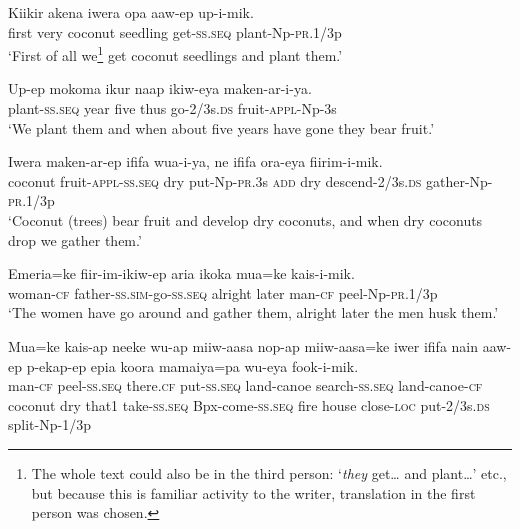 \ea
\gll  Kiikir  akena  iwera  opa  aaw-ep  up-i-mik. \\
first  very  coconut  seedling  get-\textsc{ss.seq}  plant-Np-\textsc{pr}.1/3p \\
\glt ‘First of all we\footnote{The whole text could also be in the third person: ‘\textit{they} get… and plant…’  etc., but because this is familiar activity to the writer, translation in the first person was chosen.} get coconut seedlings and plant them.’ \\
\z


\ea
\gll  Up-ep  mokoma  ikur  naap  ikiw-eya  maken-ar-i-ya. \\
plant-\textsc{ss.seq}  year  five  thus  go-2/3s.\textsc{ds}  fruit-\textsc{appl}-Np-3s \\
\glt ‘We plant them and when about five years have gone they bear fruit.’ \\
\z


\ea
\gll  Iwera  maken-ar-ep  ififa  wua-i-ya,  ne  ififa  ora-eya            fiirim-i-mik. \\
coconut  fruit-\textsc{appl}-\textsc{ss.seq}  dry  put-Np-\textsc{pr}.3s  \textsc{add}  dry  descend-2/3s.\textsc{ds}  gather-Np-\textsc{pr}.1/3p \\


\glt ‘Coconut (trees) bear fruit and develop dry coconuts, and when dry coconuts drop we gather them.’ \\
\z


\ea
\gll  Emeria=ke  fiir-im-ikiw-ep  aria  ikoka  mua=ke  kais-i-mik. \\
woman-\textsc{cf}  father-\textsc{ss}.\textsc{sim}-go-\textsc{ss.seq}  alright  later  man-\textsc{cf}  peel-Np-\textsc{pr}.1/3p \\
\glt ‘The women have go around and gather them, alright later the men husk them.’ \\
\z


\ea
\gll  Mua=ke  kais-ap  neeke  wu-ap  miiw-aasa  nop-ap               miiw-aasa=ke  iwer  ififa  nain  aaw-ep  p-ekap-ep  epia  koora                    mamaiya=pa  wu-eya  fook-i-mik. \\
man-\textsc{cf}  peel-\textsc{ss.seq}  there.\textsc{cf}  put-\textsc{ss.seq}  land-canoe  search-\textsc{ss.seq} land-canoe-\textsc{cf}  coconut  dry  that1  take-\textsc{ss.seq}  Bpx-come-\textsc{ss.seq}  fire  house      close-\textsc{loc}  put-2/3s.\textsc{ds}  split-Np-1/3p \\




